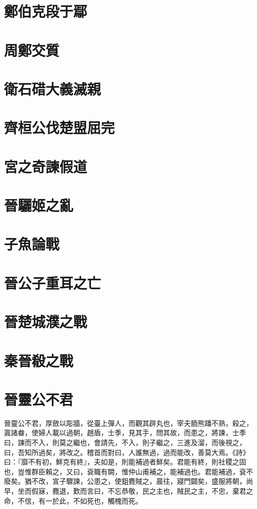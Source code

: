 \documentclass{article}
\date{}
\newcommand{\tsu}{\small\kaishu\color{brown}}
\begin{document}
\makecover
\tableofcontents

\section{鄭伯克段于鄢}

\section{周鄭交質}

\section{衛石碏大義滅親}

\section{齊桓公伐楚盟屈完}

\section{宮之奇諫假道}

\section{晉驪姬之亂}

\section{子魚論戰}

\section{晉公子重耳之亡}

\section{晉楚城濮之戰}

\section{秦晉殽之戰}

\section{晉靈公不君}

\noindent{\tsu 宣公二年}

晉靈公不君，厚斂以彫牆，從臺上彈人，而觀其辟丸也，宰夫胹熊蹯不熟，殺之，寘諸畚，使婦人載以過朝，趙盾，士季，見其手，問其故，而患之，將諫，士季曰，諫而不入，則莫之繼也，會請先，不入，則子繼之，三進及溜，而後視之，曰，吾知所過矣，將改之。稽首而對曰，人誰無過，過而能改，善莫大焉。《詩》曰：『靡不有初，鮮克有終』，夫如是，則能補過者鮮矣。君能有終，則社稷之固也，豈惟群臣賴之，又曰，袞職有闕，惟仲山甫補之，能補過也。君能補過，袞不廢矣。猶不改，宣子驟諫，公患之，使鉏麑賊之，晨往，寢門闢矣，盛服將朝，尚早，坐而假寐，麑退，歎而言曰，不忘恭敬，民之主也，賊民之主，不忠，棄君之命，不信，有一於此，不如死也，觸槐而死。
\end{document}
